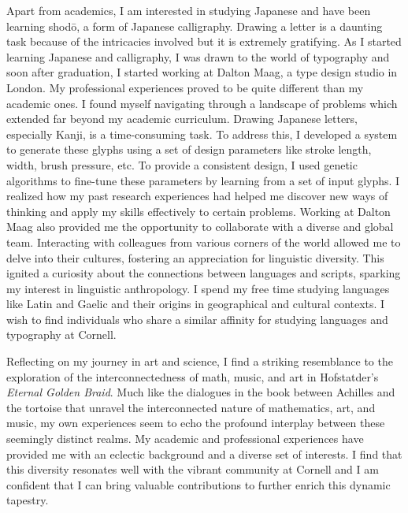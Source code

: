 \documentclass[12pt]{article}
\begin{document}
Apart from academics, I am interested in studying Japanese and have been
learning shodō, a form of Japanese calligraphy. Drawing a letter is a daunting
task because of the intricacies involved but it is extremely gratifying. As I
started learning Japanese and calligraphy, I was drawn to the world of
typography and soon after graduation, I started working at Dalton Maag, a type
design studio in London. My professional experiences proved to be quite
different than my academic ones. I found myself navigating through a landscape
of problems which extended far beyond my academic curriculum. Drawing Japanese
letters, especially Kanji, is a time-consuming task. To address this, I
developed a system to generate these glyphs using a set of design parameters
like stroke length, width, brush pressure, etc. To provide a consistent design,
I used genetic algorithms to fine-tune these parameters by learning from a set
of input glyphs. I realized how my past research experiences had helped me
discover new ways of thinking and apply my skills effectively to certain
problems. Working at Dalton Maag also provided me the opportunity to collaborate
with a diverse and global team. Interacting with colleagues from various corners
of the world allowed me to delve into their cultures, fostering an appreciation
for linguistic diversity. This ignited a curiosity about the connections between
languages and scripts, sparking my interest in linguistic anthropology. I spend
my free time studying languages like Latin and Gaelic and their origins in
geographical and cultural contexts. I wish to find individuals who share a
similar affinity for studying languages and typography at Cornell.

Reflecting on my journey in art and science, I find a striking resemblance to
the exploration of the interconnectedness of math, music, and art in
Hofstatder’s \textit{Eternal Golden Braid}. Much like the dialogues in the book between
Achilles and the tortoise that unravel the interconnected nature of mathematics,
art, and music, my own experiences seem to echo the profound interplay between
these seemingly distinct realms. My academic and professional experiences have
provided me with an eclectic background and a diverse set of interests. I find
that this diversity resonates well with the vibrant community at Cornell and I am
confident that I can bring valuable contributions to further enrich this dynamic
tapestry.
\end{document}
